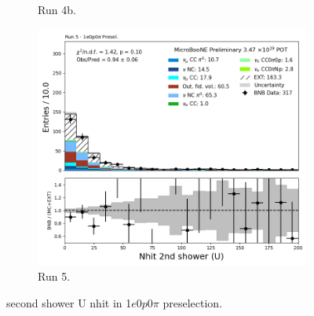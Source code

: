 \begin{figure}[H]
\begin{subfigure}[t]{0.32\linewidth}
        \caption{Run 4b.}
    \end{subfigure}%
    \hspace{0.2cm}%
    \begin{subfigure}[t]{0.32\linewidth}
        \includegraphics[width=\linewidth]{technote/Appendix_Preselection/Figures/1e0p0pi/Run5/secondshower_U_nhit_Run5_1e0p0pi_Presel.png}
        \caption{Run 5.}
    \end{subfigure}
    \caption{second shower U nhit in 1$e$0$p$0$\pi$ preselection.}
\end{figure}

